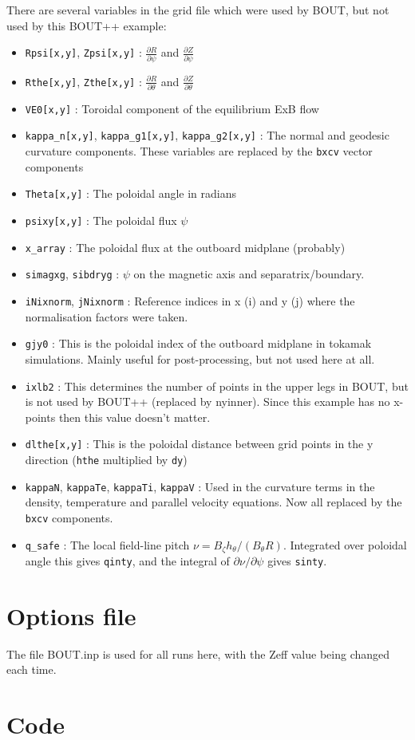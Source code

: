 \documentclass[12pt]{article}
\newcommand{\deriv}[2]{\ensuremath{\frac{\partial #1}{\partial #2}}}
\newcommand{\code}[1]{\texttt{#1}}
\newcommand{\hthe}{\ensuremath{h_\theta}}
\newcommand{\Bp}{\ensuremath{B_\theta}}
\newcommand{\Bt}{\ensuremath{B_\zeta}}
\begin{document}
There are several variables in the grid file which were used by BOUT, but not used by this BOUT++ example:
\begin{itemize}
\item \code{Rpsi[x,y]}, \code{Zpsi[x,y]} : \deriv{R}{\psi} and \deriv{Z}{\psi}
\item \code{Rthe[x,y]}, \code{Zthe[x,y]} : \deriv{R}{\theta} and \deriv{Z}{\theta}
\item \code{VE0[x,y]} : Toroidal component of the equilibrium ExB flow
\item \code{kappa\_n[x,y]}, \code{kappa\_g1[x,y]}, \code{kappa\_g2[x,y]} : The normal and geodesic curvature components. These
  variables are replaced by the \code{bxcv} vector components
\item \code{Theta[x,y]} : The poloidal angle in radians
\item \code{psixy[x,y]} : The poloidal flux $\psi$ 
\item \code{x\_array} : The poloidal flux at the outboard midplane (probably)
\item \code{simagxg}, \code{sibdryg} : $\psi$ on the magnetic axis and separatrix/boundary.
\item \code{iNixnorm}, \code{jNixnorm} : Reference indices in x (i) and y (j) where the normalisation factors were
  taken.
\item \code{gjy0} : This is the poloidal index of the outboard midplane in tokamak simulations. Mainly useful for
  post-processing, but not used here at all.
\item \code{ixlb2} : This determines the number of points in the upper legs in BOUT, but is not used by BOUT++ 
  (replaced by nyinner). Since this example has no x-points then this value doesn't matter.
\item \code{dlthe[x,y]} : This is the poloidal distance between grid points in the y direction (\code{hthe} multiplied by
  \code{dy})
\item \code{kappaN}, \code{kappaTe}, \code{kappaTi}, \code{kappaV} : Used in the curvature terms in the density,
  temperature and parallel velocity equations. Now all replaced by the \code{bxcv} components.
\item \code{q\_safe} : The local field-line pitch $\nu = \Bt\hthe / \left(\Bp R\right)$. Integrated over
  poloidal angle this gives \code{qinty}, and the integral of $\partial\nu  / \partial\psi$ gives \code{sinty}.
\end{itemize}

\section{Options file}

The file BOUT.inp is used for all runs here, with the 
Zeff value being changed each time.

\section{Code}





\end{document}
